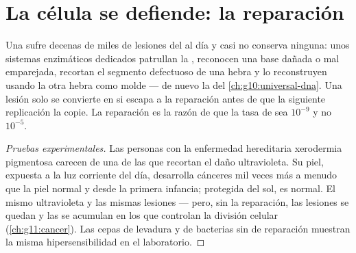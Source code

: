 \section{La célula se defiende: la reparación}

\begin{proposition}\label{prop:g11:mutations:repair}
Una  sufre decenas de miles de lesiones del  al día y casi no
conserva ninguna: unos sistemas enzimáticos dedicados patrullan la
, reconocen una base dañada o mal emparejada, recortan el
segmento defectuoso de una hebra y lo reconstruyen usando la otra hebra
como molde --- de nuevo la  del
\cref{ch:g10:universal-dna}. Una lesión solo se convierte en 
si escapa a la reparación antes de que la siguiente replicación la
copie. La reparación es la razón de que la tasa de  sea
$10^{-9}$ y no $10^{-5}$.
\end{proposition}
\begin{proof}[Pruebas experimentales]
Las personas con la enfermedad hereditaria xerodermia pigmentosa
carecen de una de las  que recortan el daño ultravioleta. Su
piel, expuesta a la luz corriente del día, desarrolla cánceres mil
veces más a menudo que la piel normal y desde la primera infancia;
protegida del sol, es normal. El mismo ultravioleta y las mismas
lesiones --- pero, sin la reparación, las lesiones se quedan y las
 se acumulan en los  que controlan la división celular
(\cref{ch:g11:cancer}). Las cepas de levadura y de bacterias sin
 de reparación muestran la misma hipersensibilidad en el
laboratorio.
\end{proof}

